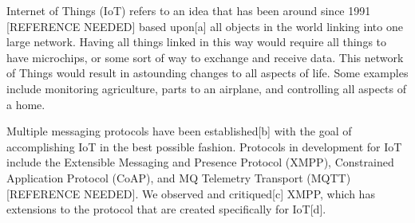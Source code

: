 Internet of Things (IoT) refers to an idea that has been around since 1991 
[REFERENCE NEEDED] based upon[a] all objects in the world linking into one 
large network. Having all things linked in this way would require all things 
to have microchips, or some sort of way to exchange and receive data. This 
network of Things would result in astounding changes to all aspects of life. 
Some examples include monitoring agriculture, parts to an airplane, and 
controlling all aspects of a home.

Multiple messaging protocols have been established[b] with the goal of 
accomplishing IoT in the best possible fashion. Protocols in development for 
IoT include the Extensible Messaging and Presence Protocol (XMPP), Constrained 
Application Protocol (CoAP), and MQ Telemetry Transport (MQTT) [REFERENCE 
NEEDED]. We observed and critiqued[c] XMPP, which has extensions to the 
protocol that are created specifically for IoT[d].
